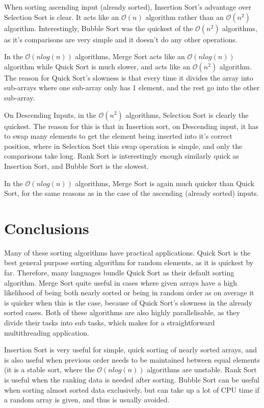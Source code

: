 \documentclass[12pt]{article}
\begin{document}
	When sorting ascending input (already sorted), Insertion Sort's advantage over Selection Sort is clear. It acts like an $ \mathcal{O} (n) $ algorithm rather than an $ \mathcal{O} (n^2) $ algorithm. Interestingly, Bubble Sort was the quickest of the $ \mathcal{O} (n^2) $ algorithms, as it's comparisons are very simple and it doesn't do any other operations.
	
	In the $ \mathcal{O} (n log(n)) $ algorithms, Merge Sort acts like an $ \mathcal{O} (n log(n)) $ algorithm while Quick Sort is much slower, and acts like an $ \mathcal{O} (n^2) $ algorithm. The reason for Quick Sort's slowness is that every time it divides the array into sub-arrays where one sub-array only has 1 element, and the rest go into the other sub-array.
	
	On Descending Inputs, in the $ \mathcal{O} (n^2) $ algorithms, Selection Sort is clearly the quickest. The reason for this is that in Insertion sort, on Descending input, it has to swap many elements to get the element being inserted into it's correct position, where in Selection Sort this swap operation is simple, and only the comparisons take long. Rank Sort is interestingly enough similarly quick as Insertion Sort, and Bubble Sort is the slowest. 
	
	In the $ \mathcal{O} (n log (n)) $ algorithms, Merge Sort is again much quicker than Quick Sort, for the same reasons as in the case of the ascending (already sorted) inputs. 
	
	\section{Conclusions}
	
	Many of these sorting algorithms have practical applications. Quick Sort is the best general purpose sorting algorithm for random elements, as it is quickest by far. Therefore, many languages bundle Quick Sort as their default sorting algorithm. Merge Sort quite useful in cases where given arrays have a high likelihood of being both nearly sorted or being in random order as on average it is quicker when this is the case, because of Quick Sort's slowness in the already sorted cases. Both of these algorithms are also highly parallelisable, as they divide their tasks into sub tasks, which makes for a straightforward multithreading application.
	
	Insertion Sort is very useful for simple, quick sorting of nearly sorted arrays, and is also useful when previous order needs to be maintained between equal elements (it is a stable sort, where the $ \mathcal{O} (n log(n)) $ algorithms are unstable. Rank Sort is useful when the ranking data is needed after sorting. Bubble Sort can be useful when sorting almost sorted data exclusively, but can take up a lot of CPU time if a random array is given, and thus is usually avoided.
		
\end{document}
